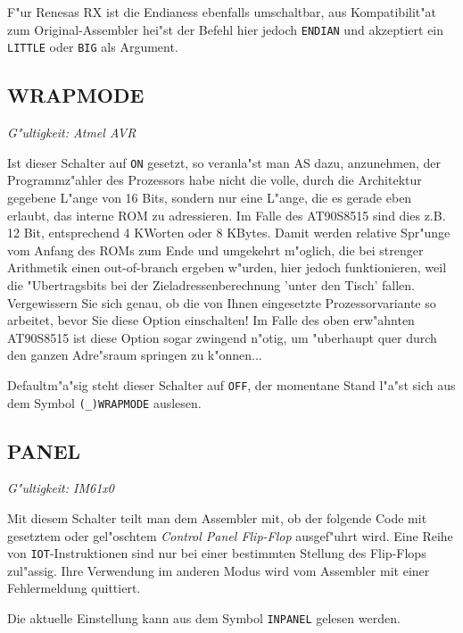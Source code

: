 \documentclass[12pt,a4paper,twoside]{report}
\makeatletter
\newcommand{\tty}[1]{{\tt #1}}
\newcommand{\ttindex}[1]{\index{#1@{\tt #1}}}
\newcommand{\asname}{AS}
\newcommand{\predefsym}[1]{{\tt (\_)#1}}
\makeatother
\begin{document}
F"ur Renesas RX ist die Endianess ebenfalls umschaltbar, aus Kompatibilit"at
zum Original-Assembler hei"st der Befehl hier jedoch \tty{ENDIAN} und
akzeptiert ein \tty{LITTLE} oder \tty{BIG} als Argument.


\subsection{WRAPMODE}
\ttindex{WRAPMODE}

{\em G"ultigkeit: Atmel AVR}

Ist dieser Schalter auf {\tt ON} gesetzt, so veranla"st man \asname{} dazu,
anzunehmen, der Programmz"ahler des Prozessors habe nicht die volle, durch
die Architektur gegebene L"ange von 16 Bits, sondern nur eine L"ange, die
es gerade eben erlaubt, das interne ROM zu adressieren.  Im Falle des
AT90S8515 sind dies z.B. 12 Bit, entsprechend 4 KWorten oder 8 KBytes.
Damit werden relative Spr"unge vom Anfang des ROMs zum Ende und umgekehrt
m"oglich, die bei strenger Arithmetik einen out-of-branch ergeben w"urden,
hier jedoch funktionieren, weil die "Ubertragsbits bei der
Zieladressenberechnung 'unter den Tisch' fallen.  Vergewissern Sie sich
genau, ob die von Ihnen eingesetzte Prozessorvariante so arbeitet, bevor
Sie diese Option einschalten!  Im Falle des oben erw"ahnten AT90S8515 ist
diese Option sogar zwingend n"otig, um "uberhaupt quer durch den ganzen
Adre"sraum springen zu k"onnen...

Defaultm"a"sig steht dieser Schalter auf {\tt OFF}, der momentane Stand
l"a"st sich aus dem Symbol \predefsym{WRAPMODE} auslesen.


\subsection{PANEL}
\ttindex{PANEL}

{\em G"ultigkeit: IM61x0}

Mit diesem Schalter teilt man dem Assembler mit, ob der folgende Code
mit gesetztem oder gel"oschtem {\em Control Panel Flip-Flop} ausgef"uhrt
wird.  Eine Reihe von {\tt IOT}-Instruktionen sind nur bei einer bestimmten
Stellung des Flip-Flops zul"assig.  Ihre Verwendung im anderen Modus
wird vom Assembler mit einer Fehlermeldung quittiert.

Die aktuelle Einstellung kann aus dem Symbol {\tt INPANEL} gelesen werden.
\end{document}
